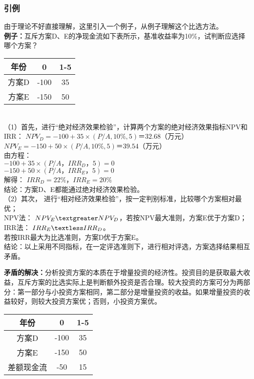 \subsubsection{引例}
由于理论不好直接理解，这里引入一个例子，从例子理解这个比选方法。\\
\textbf{例子：}互斥方案D、E的净现金流如下表所示，基准收益率为10\%，试判断应选择哪个方案？
\begin{table}[H]
\centering
\begin{tabular}{|c|c|c|}
\hline
年份   & 0 & 1-5  \\ \hline
方案D   & -100 & 35 \\ \hline
方案E   & -150 & 50 \\ \hline
\end{tabular}
\end{table}
\\
（1）首先，进行“绝对经济效果检验”，计算两个方案的绝对经济效果指标NPV和IRR：
$NPV_D=-100+35 \times (P/A,10\%,5)＝32.68$（万元）\\
$NPV_E=-150+50 \times (P/A,10\%,5)＝39.54$（万元）\\
由方程：\\
$-100+35 \times (P/A，IRR_D，5)=0$\\
$-150+50 \times (P/A，IRR_E，5)=0$\\
解得： $IRR_D=22\%$，$IRR_E=20\%$\\
结论：方案D、E都能通过绝对经济效果检验。\\
（2）其次， 进行“相对经济效果检验”，按一定判别标准，比较哪个方案相对最优；\\
NPV法： $NPV_E \textgreater NPV_D$，若按NPV最大准则，方案E优于方案D；\\
IRR法： $IRR_E \textless IRR_D$。\\
若按IRR最大为比选准则，方案D优于方案E。\\
结论：以上采用不同指标，在一定评选准则下，进行相对评选，方案选择结果相互矛盾。

\textbf{矛盾的解决：}分析投资方案的本质在于增量投资的经济性。投资目的是获取最大收益，互斥方案的比选实际上是判断额外投资是否合理。较大投资的方案可分为两部分：第一部分与小投资方案相同，第二部分是增量投资的收益。如果增量投资的收益较好，则较大投资方案优；否则，小投资方案优。

\begin{table}[H]
\centering
\begin{tabular}{|c|c|c|}
\hline
年份   & 0 & 1-5  \\ \hline
方案D   & -100 & 35 \\ \hline
方案E   & -150 & 50 \\ \hline
差额现金流   & -50 & 15 \\ \hline
\end{tabular}
\end{table}

